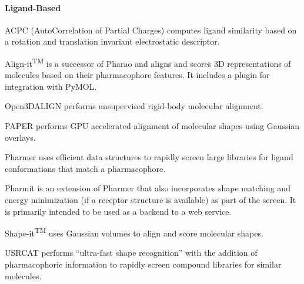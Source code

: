 \paragraph{Ligand-Based}

ACPC (AutoCorrelation of Partial Charges) \cite{Berenger_2014} computes ligand similarity based on a rotation and translation invariant electrostatic descriptor.

Align-it\textsuperscript{TM} is a successor of Pharao \cite{Taminau_2008} and aligns and scores 3D representations of molecules based on their pharmacophore features.  It includes a plugin for integration with PyMOL.

Open3DALIGN \cite{Tosco_2011} performs unsupervised rigid-body molecular alignment.

PAPER \cite{Haque_2010} performs GPU accelerated alignment of molecular shapes using Gaussian overlays.

Pharmer \cite{Koes_2011} uses efficient data structures to rapidly screen large libraries for ligand conformations that match a pharmacophore.

Pharmit \cite{Sunseri_2016} is an extension of Pharmer that also incorporates shape matching and energy minimization (if a receptor structure is available) as part of the screen.  It is primarily intended to be used as a backend to a web service.

Shape-it\textsuperscript{TM} uses Gaussian volumes to align and score molecular shapes.

USRCAT \cite{Schreyer_2012} performs ``ultra-fast shape recognition'' with the addition of pharmacophoric information to rapidly screen compound libraries for similar molecules.


